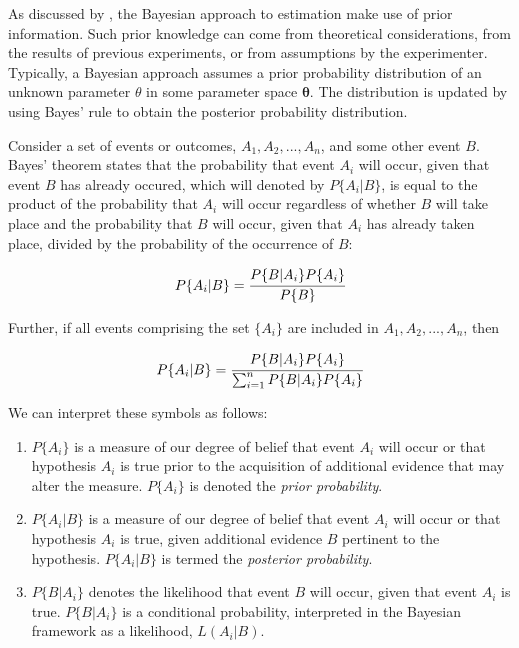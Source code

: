 \documentclass[../Parameter_fitting.tex]{subfiles}
\begin{document}
	
As discussed by \citet{Himmelblau1970}, the Bayesian approach to estimation make use of prior information. Such prior knowledge can come from theoretical considerations, from the results of previous experiments, or from assumptions by the experimenter. Typically, a Bayesian approach assumes a prior probability distribution of an unknown parameter $\theta$ in some parameter space $\boldsymbol{\theta}$. The distribution is updated by using Bayes' rule to obtain the posterior probability distribution. 

Consider a set of events or outcomes, $A_1,A_2,...,A_n$, and some other event $B$. Bayes' theorem states that the probability that event $A_i$ will occur, given that event $B$ has already occured, which will denoted by $P\{A_i|B\}$, is equal to the product of the probability that $A_i$ will occur regardless of whether $B$ will take place and the probability that $B$ will occur, given that $A_i$  has already taken place, divided by the probability of the occurrence of $B$:

{\footnotesize
	\begin{equation}
		P\{A_i|B\} = \cfrac{P\{B|A_i\}P\{A_i\}}{P\{B\}}
\end{equation} }

Further, if all events comprising the set $\{A_i\}$ are included in $A_1,A_2,...,A_n$, then

{\footnotesize
	\begin{equation} \label{EQ: Bayes_discrit}
		P\{A_i|B\} = \cfrac{P\{B|A_i\}P\{A_i\}}{ \sum_{i=1}^{n} P\{B|A_i\} P\{A_i\} }
\end{equation} }

We can interpret these symbols as follows:

\begin{enumerate}
	\item $P\{A_i\}$ is a measure of our degree of belief that event $A_i$ will occur or that hypothesis $A_i$ is true prior to the acquisition of additional evidence that may alter the measure. $P\{A_i\}$ is denoted the \textit{prior probability}.
	\item $P\{A_i|B\}$ is a measure of our degree of belief that event $A_i$ will occur or that hypothesis $A_i$ is true, given additional evidence $B$ pertinent to the hypothesis. $P\{A_i|B\}$ is termed the \textit{posterior probability}.
	\item $P\{B|A_i\}$ denotes the likelihood that event $B$ will occur, given that event $A_i$ is true. $P\{B|A_i\}$ is a conditional probability, interpreted in the Bayesian framework as a likelihood, $L(A_i|B)$.
\end{enumerate}
\end{document}
